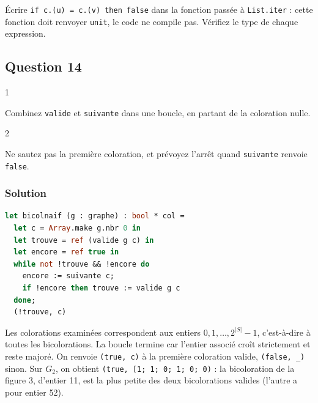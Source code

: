 \documentclass[11pt,a4paper]{article}
\begin{document}
\begin{piege}

Écrire \texttt{if\ c.(\allowbreak{}u)\allowbreak{}\ =\allowbreak{}\ c.(\allowbreak{}v)\allowbreak{}\ then\ false} dans la fonction passée à \texttt{List.iter} : cette fonction doit renvoyer \texttt{unit}, le code ne compile pas. Vérifiez le type de chaque expression.

\end{piege}

\hypertarget{question-14}{%
\subsection{Question 14}\label{question-14}}

\begin{indication}{1}

Combinez \texttt{valide} et \texttt{suivante} dans une boucle, en partant de la coloration nulle.

\end{indication}

\begin{indication}{2}

Ne sautez pas la première coloration, et prévoyez l'arrêt quand \texttt{suivante} renvoie \texttt{false}.

\end{indication}

\hypertarget{solution-13}{%
\subsubsection{Solution}\label{solution-13}}

\begin{lstlisting}[language=Caml]
let bicolnaif (g : graphe) : bool * col =
  let c = Array.make g.nbr 0 in
  let trouve = ref (valide g c) in
  let encore = ref true in
  while not !trouve && !encore do
    encore := suivante c;
    if !encore then trouve := valide g c
  done;
  (!trouve, c)
\end{lstlisting}

Les colorations examinées correspondent aux entiers \(0, 1, \dots, 2^{|S|} - 1\), c'est-à-dire à toutes les bicolorations. La boucle termine car l'entier associé croît strictement et reste majoré. On renvoie \texttt{(true,\ c)} à la première coloration valide, \texttt{(false,\ \_)} sinon. Sur \(G_2\), on obtient \texttt{(\allowbreak{}true,\allowbreak{}\ {[}\textbar{}1;\allowbreak{}\ 1;\allowbreak{}\ 0;\allowbreak{}\ 1;\allowbreak{}\ 0;\allowbreak{}\ 0\textbar{}{]}\allowbreak{})\allowbreak{}} : la bicoloration de la figure 3, d'entier 11, est la plus petite des deux bicolorations valides (l'autre a pour entier 52).
\end{document}
